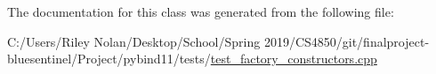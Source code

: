 The documentation for this class was generated from the following file\+:\begin{DoxyCompactItemize}
\item 
C\+:/\+Users/\+Riley Nolan/\+Desktop/\+School/\+Spring 2019/\+C\+S4850/git/finalproject-\/bluesentinel/\+Project/pybind11/tests/\mbox{\hyperlink{test__factory__constructors_8cpp}{test\+\_\+factory\+\_\+constructors.\+cpp}}\end{DoxyCompactItemize}
